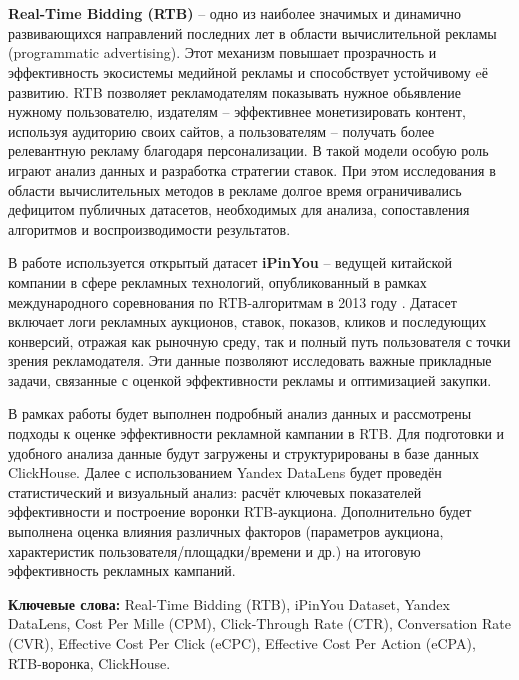 \section*{}
\textbf{Real-Time Bidding (RTB)} -- одно из наиболее значимых и динамично развивающихся направлений последних лет в области вычислительной рекламы (programmatic advertising). Этот механизм повышает прозрачность и эффективность экосистемы медийной рекламы и способствует устойчивому eё развитию. RTB позволяет рекламодателям показывать нужное обьявление нужному пользователю, издателям -- эффективнее монетизировать контент, используя аудиторию своих сайтов, а пользователям -- получать более релевантную рекламу благодаря персонализации. В такой модели особую роль играют анализ данных и разработка стратегии ставок. При этом исследования в области вычислительных методов в рекламе долгое время ограничивались дефицитом публичных датасетов, необходимых для анализа, сопоставления алгоритмов и воспроизводимости результатов.

В работе используется открытый датасет \textbf{iPinYou} -- ведущей китайской компании в сфере рекламных технологий, опубликованный в рамках международного соревнования по RTB-алгоритмам в 2013 году \cite{ipinyou-contest-database}. Датасет включает логи рекламных аукционов, ставок, показов, кликов и последующих конверсий, отражая как рыночную среду, так и полный путь пользователя с точки зрения рекламодателя. Эти данные позволяют исследовать важные прикладные задачи, связанные с оценкой эффективности рекламы и оптимизацией закупки.

В рамках работы будет выполнен подробный анализ данных и рассмотрены подходы к оценке эффективности рекламной кампании в RTB. Для подготовки и удобного анализа данные будут загружены и структурированы в базе данных ClickHouse. Далее с использованием Yandex DataLens будет проведён статистический и визуальный анализ: расчёт ключевых показателей эффективности и построение воронки RTB-аукциона. Дополнительно будет выполнена оценка влияния различных факторов (параметров аукциона, характеристик пользователя/площадки/времени и др.) на итоговую эффективность рекламных кампаний.

\vspace{2em}
\textbf{Ключевые слова:} Real-Time Bidding (RTB), iPinYou Dataset, Yandex DataLens, Cost Per Mille (CPM), Click-Through Rate (CTR), Conversation Rate (CVR), Effective Cost Per Click (eCPC), Effective Cost Per Action (eCPA), RTB-воронка, ClickHouse.

